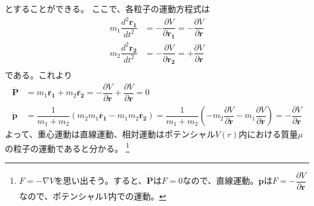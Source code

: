 \documentclass[dvipdfmx,a4paper,16pt]{jsarticle}
\begin{document}
とすることができる。
ここで、各粒子の運動方程式は
\begin{align}
	m_1 \dfrac{d^2 \bm{r_1}}{d t^2} &= - \dfrac{\partial V}{\partial \bm{r_1}} = - \dfrac{\partial V}{\partial \bm{r}} \\
	m_2 \dfrac{d^2 \bm{r_2}}{d t^2} &= - \dfrac{\partial V}{\partial \bm{r_2}} = + \dfrac{\partial V}{\partial \bm{r}} \\
\end{align}
である。これより
\begin{align}
	\dot{\bm{P}} &= m_1\ddot{\bm{r_1}} + m_2\ddot{\bm{r_2}} = - \dfrac{\partial V}{\partial \bm{r}} + \dfrac{\partial V}{\partial \bm{r}} = 0 \\
	\dot{\bm{p}} &= \dfrac{1}{m_1 + m_2}(m_2 m_1 \ddot{\bm{r_1}} - m_1 m_2 \ddot{\bm{r_2}}) =
	\dfrac{1}{m_1 + m_2}\left( -m_2 \dfrac{\partial V}{\partial \bm{r}} - m_1\dfrac{\partial V}{\partial \bm{r}} \right)
	= -\dfrac{\partial V}{\partial \bm{r}}
\end{align}
よって、重心運動は直線運動、相対運動はポテンシャル$V(r)$内における質量$\mu$の粒子の運動であると分かる。
\footnote{$F = -\nabla V$を思い出そう。すると、$\dot{\bm{P}}$は$F = 0$なので、直線運動。$\dot{\bm{p}}$は$F = - \dfrac{\partial V}{\partial \bm{r}}$なので、ポテンシャル$V$内での運動。}
\end{document}
